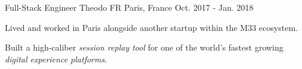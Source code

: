 \begin{cventries}
  \cventry
    {Full-Stack Engineer} %
    {Theodo FR} %
    {Paris, France} %
    {Oct. 2017 - Jan. 2018} %
    {
      \begin{cvitems} %
        \item Lived and worked in Paris alongside another startup within the M33 ecosystem. 
        \item Built a high-caliber \textit{session replay tool} for one of the world's fastest growing \textit{digital experience platforms}.
      \end{cvitems}
    }
    {}


\end{cventries}
